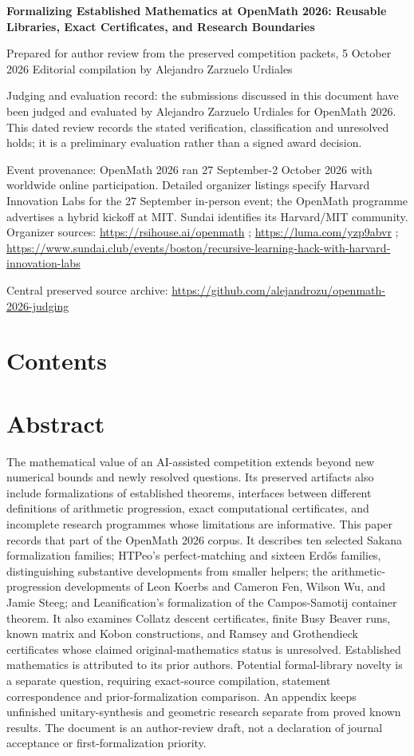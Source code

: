 \documentclass[11pt,a4paper]{article}
\begin{document}
{\LARGE\bfseries Formalizing Established Mathematics at OpenMath 2026: Reusable Libraries, Exact Certificates, and Research Boundaries\par}\medskip
{\small Prepared for author review from the preserved competition packets, 5 October 2026
Editorial compilation by Alejandro Zarzuelo Urdiales\par}\medskip
{\small Judging and evaluation record: the submissions discussed in this document have been judged and evaluated by Alejandro Zarzuelo Urdiales for OpenMath 2026. This dated review records the stated verification, classification and unresolved holds; it is a preliminary evaluation rather than a signed award decision.\par}

{\small Event provenance: OpenMath 2026 ran 27 September-2 October 2026 with worldwide online participation. Detailed organizer listings specify Harvard Innovation Labs for the 27 September in-person event; the OpenMath programme advertises a hybrid kickoff at MIT. Sundai identifies its Harvard/MIT community. Organizer sources: \url{https://rsihouse.ai/openmath} ; \url{https://luma.com/yzp9abvr} ; \url{https://www.sundai.club/events/boston/recursive-learning-hack-with-harvard-innovation-labs}\par}

Central preserved source archive: \url{https://github.com/alejandrozu/openmath-2026-judging}

\clearpage
\section{Contents}
\tableofcontents
\section{Abstract}
The mathematical value of an AI-assisted competition extends beyond new numerical bounds and newly resolved questions. Its preserved artifacts also include formalizations of established theorems, interfaces between different definitions of arithmetic progression, exact computational certificates, and incomplete research programmes whose limitations are informative. This paper records that part of the OpenMath 2026 corpus. It describes ten selected Sakana formalization families; HTPeo's perfect-matching and sixteen Erdős families, distinguishing substantive developments from smaller helpers; the arithmetic-progression developments of Leon Koerbs and Cameron Fen, Wilson Wu, and Jamie Steeg; and Leanification's formalization of the Campos-Samotij container theorem. It also examines Collatz descent certificates, finite Busy Beaver runs, known matrix and Kobon constructions, and Ramsey and Grothendieck certificates whose claimed original-mathematics status is unresolved. Established mathematics is attributed to its prior authors. Potential formal-library novelty is a separate question, requiring exact-source compilation, statement correspondence and prior-formalization comparison. An appendix keeps unfinished unitary-synthesis and geometric research separate from proved known results. The document is an author-review draft, not a declaration of journal acceptance or first-formalization priority.
\end{document}
